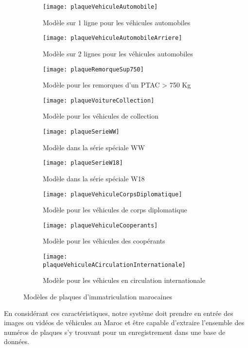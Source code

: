        \begin{figure}[H]
            \begin{subfigure}{0.3\textwidth}
                \texttt{[image: plaqueVehiculeAutomobile]}
                \caption{Modèle sur 1 ligne pour les véhicules automobiles}
            \end{subfigure}
            \hfill
            \begin{subfigure}{0.3\textwidth}
                \texttt{[image: plaqueVehiculeAutomobileArriere]}
                \caption{Modèle sur 2 lignes pour les véhicules automobiles}
            \end{subfigure}
            \hfill
            \begin{subfigure}{0.3\textwidth}
                \texttt{[image: plaqueRemorqueSup750]}
                \caption{Modèle pour les remorques d'un PTAC > 750 Kg}
            \end{subfigure}

            \begin{subfigure}{0.3\textwidth}
                \texttt{[image: plaqueVoitureCollection]}
                \caption{Modèle pour les véhicules de collection}
            \end{subfigure}
            \hfill
            \begin{subfigure}{0.3\textwidth}
                \texttt{[image: plaqueSerieWW]}
                \caption{Modèle dans la série spéciale WW}
            \end{subfigure}
            \hfill
            \begin{subfigure}{0.3\textwidth}
                \texttt{[image: plaqueSerieW18]}
                \caption{Modèle dans la série spéciale W18}
            \end{subfigure}

            \begin{subfigure}{0.3\textwidth}
                \texttt{[image: plaqueVehiculeCorpsDiplomatique]}
                \caption{Modèle pour les véhicules de corps diplomatique}
            \end{subfigure}
            \hfill
            \begin{subfigure}{0.3\textwidth}
                \texttt{[image: plaqueVehiculeCooperants]}
                \caption{Modèle pour les véhicules des coopérants}
            \end{subfigure}
            \hfill
            \begin{subfigure}{0.3\textwidth}
                \texttt{[image: plaqueVehiculeACirculationInternationale]}
                \caption{Modèle pour les véhicules en circulation internationale}
            \end{subfigure}
            \caption{Modèles de plaques d'immatriculation marocaines \cite{mineq}}
        \end{figure}
    En considérant ces caractéristiques, notre système doit prendre en entrée des images ou vidéos de véhicules au Maroc et être capable d'extraire l'ensemble des  numéros de plaques s'y trouvant pour un enregistrement dans une base de données.

